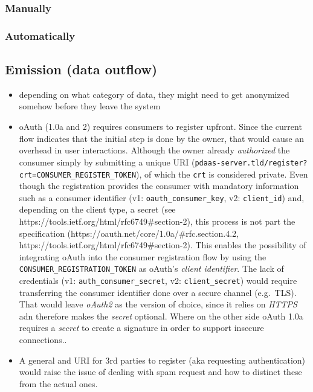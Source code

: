 \documentclass[12pt,english,a4paper,titlepage,cleardoublepage=empty,dottedtoc]{report}
\begin{document}
\subsubsection{Manually}\label{manually}

\subsubsection{Automatically}\label{automatically}

\subsection{Emission (data outflow)}\label{emission-data-outflow}

\begin{itemize}
\item
  depending on what category of data, they might need to get anonymized
  somehow before they leave the system
\item
  oAuth (1.0a and 2) requires consumers to register upfront. Since the
  current flow indicates that the initial step is done by the owner,
  that would cause an overhead in user interactions. Although the owner
  already \emph{authorized} the consumer simply by submitting a unique
  URI
  (\texttt{pdaas-server.tld/register?crt=CONSUMER\_REGISTER\_TOKEN}), of
  which the \texttt{crt} is considered private. Even though the
  registration provides the consumer with mandatory information such as
  a consumer identifier (v1: \texttt{oauth\_consumer\_key}, v2:
  \texttt{client\_id}) and, depending on the client type, a secret (see
  https://tools.ietf.org/html/rfc6749\#section-2), this process is not
  part the specification (https://oauth.net/core/1.0a/\#rfc.section.4.2,
  https://tools.ietf.org/html/rfc6749\#section-2). This enables the
  possibility of integrating oAuth into the consumer registration flow
  by using the \texttt{CONSUMER\_REGISTRATION\_TOKEN} as oAuth's
  \emph{client identifier}. The lack of credentials (v1:
  \texttt{auth\_consumer\_secret}, v2: \texttt{client\_secret}) would
  require transferring the consumer identifier done over a secure
  channel (e.g.~TLS). That would leave \emph{oAuth2} as the version of
  choice, since it relies on \emph{HTTPS} adn therefore makes the
  \emph{secret} optional. Where on the other side oAuth 1.0a requires a
  \emph{secret} to create a signature in order to support insecure
  connections..
\item
  A general and URI for 3rd parties to register (aka requesting
  authentication) would raise the issue of dealing with spam request and
  how to distinct these from the actual ones.
\end{itemize}
\end{document}
